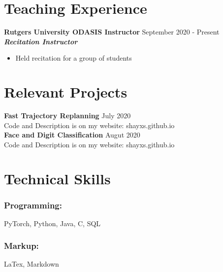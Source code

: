 \documentclass{article}
\begin{document}
\section{Teaching Experience}
\textbf{Rutgers University ODASIS Instructor}
\hfill{September 2020 - Present}\\
\textit{\textbf{Recitation Instructor}}
\begin{itemize}
  \itemsep0em
  \item Held recitation for a group of students\\
\end{itemize}


\section{Relevant Projects}
\textbf{Fast Trajectory Replanning}
\hfill{July 2020}\\
Code and Description is on my website: shayxs.github.io\\

\noindent \textbf{Face and Digit Classification}
\hfill{Augut 2020}\\
Code and Description is on my website: shayxs.github.io

\section{Technical Skills}

\subsubsection{Programming:}

PyTorch, Python, Java, C, SQL

\subsubsection{Markup:}

LaTex, Markdown
\end{document}
